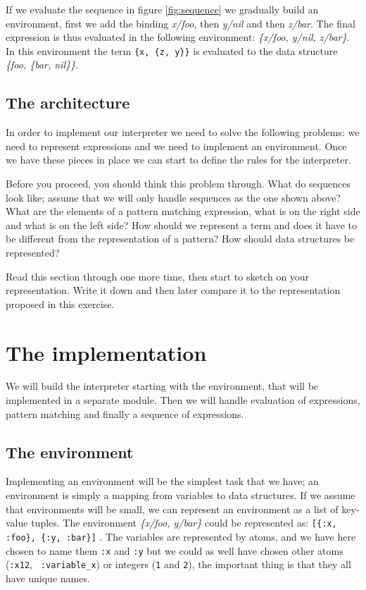 \documentclass[a4paper,11pt]{article}
\begin{document}
If we evaluate the sequence in figure \ref{fig:sequence} we gradually
build an environment, first we add the binding {\em x/foo}, then {\em
  y/nil} and then {\em z/bar}. The final expression is thus evaluated
in the following environment: {\em \{x/foo, y/nil, z/bar\}}. In this
environment the term \verb+{x, {z, y}}+ is evaluated to the data
structure {\em \{foo, \{bar, nil\}\}}.

\subsection{The architecture}
In order to implement our interpreter we need to solve the following
problems: we need to represent expressions and we need to implement an
environment. Once we have these pieces in place we can start to define
the rules for the interpreter.

Before you proceed, you should think this problem through. What do
sequences look like; assume that we will only handle sequences as the
one shown above? What are the elements of a pattern
matching expression, what is on the right side and what is on the left
side? How should we represent a term and does it have to be different
from the representation of a pattern? How should data structures be
represented?

Read this section through one more time, then start to sketch on your
representation. Write it down and then later compare it to the
representation proposed in this exercise. 


\section{The implementation}

We will build the interpreter starting with the environment, that will
be implemented in a separate module. Then we will handle evaluation
of expressions, pattern matching and finally a sequence of
expressions.

\subsection{The environment}

Implementing an environment will be the simplest task that we have; an
environment is simply a mapping from variables to data structures. If
we assume that environments will be small, we can represent an
environment as a list of key-value tuples. The environment {\em
  \{x/foo, y/bar\}} could be represented as:
\verb+[{:x, :foo}, {:y, :bar}]+ . The variables are represented by
atoms, and we have here chosen to name them {\tt :x} and {\tt :y} but
we could as well have chosen other atoms ({\tt :x12}, {\tt
  :variable\_x}) or integers ({\tt 1} and {\tt 2}), the important
thing is that they all have unique names.
\end{document}
